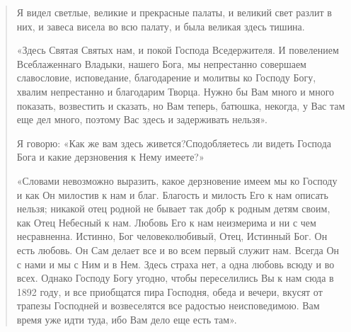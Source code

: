 \begin{quotation}
Я видел светлые, великие и прекрасные палаты, и великий свет разлит в них, и завеса висела во всю палату, и была великая здесь тишина. 

«Здесь Святая Святых нам, и покой Господа Вседержителя. И повелением Всеблаженнаго Владыки, нашего Бога, мы непрестанно совершаем славословие, исповедание, благодарение и молитвы ко Господу Богу, хвалим непрестанно и благодарим Творца. Нужно бы Вам много и много показать, возвестить и сказать, но Вам теперь, батюшка, некогда, у Вас там еще дел много, поэтому Вас здесь и задерживать нельзя». 

Я говорю: «Как же вам здесь живется?Сподобляетесь ли видеть Господа Бога и какие 
 дерзновения к Нему имеете?»

«Словами невозможно выразить, какое дерзновение имеем мы ко Господу и как Он милостив к нам и благ. Благость и милость Его к нам описать нельзя; никакой отец родной не бывает так добр к родным детям своим, как Отец Небесный к нам. Любовь Его к нам неизмерима и ни с чем несравненна. Истинно, Бог человеколюбивый, Отец, Истинный Бог. Он есть любовь. Он Сам делает все и во всем первый служит нам. Всегда Он с нами и мы с Ним и в Нем. Здесь страха нет, а одна любовь всюду и во всех. Однако Господу Богу угодно, чтобы переселились Вы к нам сюда в 1892 году, и все приобщатся пира Господня, обеда и вечери, вкусят от трапезы Господней и возвеселятся все радостью неисповедимою. Вам время уже идти туда, ибо Вам дело еще есть там».




\end{quotation}
